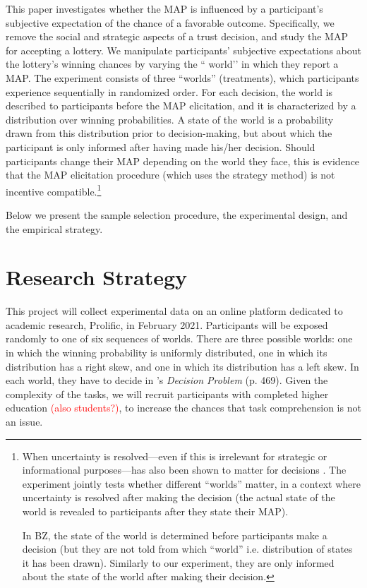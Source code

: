 This paper investigates whether the MAP is influenced by a participant’s subjective expectation of the chance of a favorable outcome. 
Specifically, we remove the social and strategic aspects of a trust decision, and study the MAP for accepting a lottery.
We manipulate participants’ subjective expectations about the lottery’s winning chances by varying the `` world’’ in which they report a MAP.
The experiment consists of three ``worlds'' (treatments), which participants experience sequentially in randomized order.
For each decision, the world is described to participants before the MAP elicitation, and it is characterized by a distribution over winning probabilities.
A state of the world is a probability drawn from this distribution prior to decision-making, but about which the participant is only informed after having made his/her decision.
Should participants change their MAP depending on the world they face, this is evidence that the MAP elicitation procedure (which uses the strategy method) is not incentive compatible.\footnote{
When uncertainty is resolved—even if this is irrelevant for strategic or informational purposes—has also been shown to matter for decisions \citep[see footnote 11 on p. 29 in][]{Johnson2019}.
The experiment jointly tests whether different ``worlds'' matter, in a context where uncertainty is resolved after making the decision (the actual state of the world is revealed to participants after they state their MAP).

In BZ, the state of the world is determined before participants make a decision (but they are not told from which ``world'' i.e. distribution of states it has been drawn).
Similarly to our experiment, they are only informed about the state of the world after making their decision.
}

Below we present the sample selection procedure, the experimental design, and the empirical strategy.



\section{Research Strategy}

This project will collect experimental data on an online platform dedicated to academic research, Prolific, in February 2021. Participants will be exposed randomly to one of six sequences of worlds.
There are three possible worlds: one in which the winning probability is uniformly distributed, one in which its distribution has a right skew, and one in which its distribution has a left skew.
In each world, they have to decide in \citeauthor{Bohnet2004}'s \citeyear{Bohnet2004} \textit{Decision Problem} (p. 469). Given the complexity of the tasks, we will recruit participants with completed higher education \textcolor{red}{(also students?)}, to increase the chances that task comprehension is not an issue.

